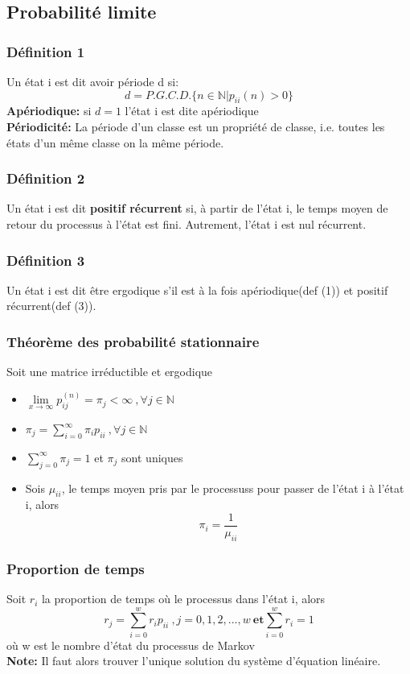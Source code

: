 \documentclass[13pt]{article}
\begin{document}
\subsection*{Probabilité limite}

\subsubsection*{Définition 1}
Un état i est dit avoir période d si:
\[ d = P.G.C.D.\{ n \in \mathbb{N}|p_{ii}{(n)} > 0 \} \]
\textbf{Apériodique:} si $d=1$ l'état i est dite apériodique\\
\textbf{Périodicité:} La période d'un classe est un propriété de classe, i.e. toutes les états d'un même classe on la même période.

\subsubsection*{Définition 2}
Un état i est dit \textbf{positif récurrent} si, à partir de l'état i, le temps moyen de retour 
du processus à l'état  est fini. Autrement, l'état i est nul récurrent.

\subsubsection*{Définition 3}
Un état i est dit être ergodique s’il est à la fois apériodique(def (1)) et positif récurrent(def (3)).

\subsubsection*{Théorème des probabilité stationnaire}
Soit une matrice irréductible et ergodique
\begin{itemize}
  \item $\lim\limits_{x \to \infty} p_{ij}^{(n)} = \pi_j < \infty \:,\forall j \in \mathbb{N}$ 
  \item $\pi_j = \sum\limits_{i=0}^\infty \pi_i p_{ii} \:,\forall j \in \mathbb{N}$
  \item $\sum\limits_{j=0}^\infty \pi_j = 1$ et $\pi_j$ sont uniques
  \item Sois $\mu_{ii}$, le temps moyen pris par le processuss pour passer de l'état i à l'état i, alors
  \[ \pi_i = \frac{1}{\mu_{ii}} \]
\end{itemize}

\subsubsection*{Proportion de temps}
Soit $r_i$ la proportion de temps où le processus dans l'état i, alors 
\[ r_j = \sum_{i=0}^w r_i p_{ii}\:,j=0,1,2,...,w\: \textbf{et} \sum_{i=0}^w r_i = 1 \]
où w est le nombre d'état du processus de Markov \\
\textbf{Note:} Il faut alors trouver l'unique solution du système d'équation linéaire.
\end{document}
